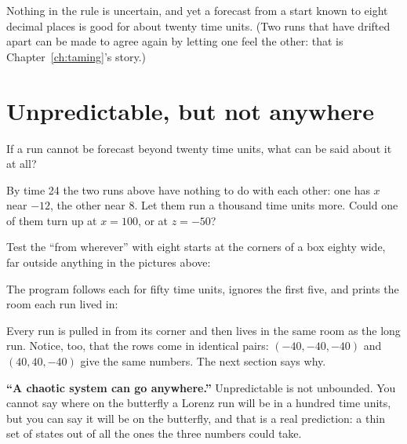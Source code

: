 
\noindent
Nothing in the rule is uncertain, and yet a forecast from a start known to
eight decimal places is good for about twenty time units. (Two runs that
have drifted apart can be made to agree again by letting one feel the other:
that is Chapter~\ref{ch:taming}'s story.)

\section{Unpredictable, but not anywhere}
\label{sec:ch09-attractor}

\noindent
If a run cannot be forecast beyond twenty time units, what can be said about
it at all?

\begin{think}
By time 24 the two runs above have nothing to do with each other: one has
$x$ near $-12$, the other near $8$. Let them run a thousand time units more.
Could one of them turn up at $x = 100$, or at $z = -50$?
\end{think}
Test the \enquote{from wherever} with eight starts at the corners of a box
eighty wide, far outside anything in the pictures above:


\noindent
The program follows each for fifty time units, ignores the first five, and
prints the room each run lived in:


\noindent
Every run is pulled in from its corner and then lives in the same room as the
long run. Notice, too, that the rows come in identical pairs:
$(-40, -40, -40)$ and $(40, 40, -40)$ give the same numbers. The next section
says why.

\begin{trapbox}
\textbf{\enquote{A chaotic system can go anywhere.}} Unpredictable is not
unbounded. You cannot say where on the butterfly a Lorenz run will be in a
hundred time units, but you can say it will be on the butterfly, and that is
a real prediction: a thin set of states out of all the ones the three numbers
could take.
\end{trapbox}

